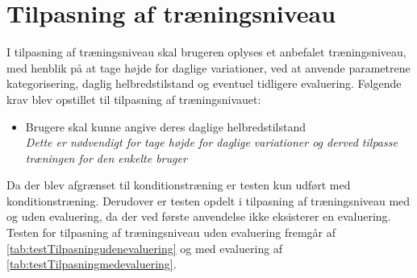 \section{Tilpasning af træningsniveau}
I tilpasning af træningsniveau skal brugeren oplyses et anbefalet træningsniveau, med henblik på at tage højde for daglige variationer, ved at anvende parametrene kategorisering, daglig helbredstilstand og eventuel tidligere evaluering. Følgende krav blev opstillet til tilpasning af træningsnivauet:

\begin{itemize}
\item Brugere skal kunne angive deres daglige helbredstilstand
\\
\textit{Dette er nødvendigt for tage højde for daglige variationer og derved tilpasse træningen for den enkelte bruger}
\end{itemize}

\noindent
Da der blev afgrænset til konditionstræning er testen kun udført med konditionstræning. Derudover er testen opdelt i tilpasning af træningsniveau med og uden evaluering, da der ved første anvendelse ikke eksisterer en evaluering. Testen for tilpasning af træningsniveau uden evaluering fremgår af \autoref{tab:testTilpasningudenevaluering} og med evaluering af \autoref{tab:testTilpasningmedevaluering}.

